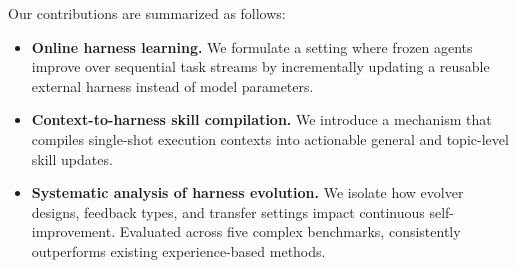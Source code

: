 Our contributions are summarized as follows:
\begin{itemize}[itemsep=0pt,topsep=2pt,leftmargin=*]
    \item \textbf{Online harness learning.}
    We formulate a setting where frozen agents improve over sequential task streams by incrementally updating a reusable external harness instead of model parameters.
    
    \item \textbf{Context-to-harness skill compilation.}
    We introduce a mechanism that compiles single-shot execution contexts into actionable general and topic-level skill updates.
    
    \item \textbf{Systematic analysis of harness evolution.}
    We isolate how evolver designs, feedback types, and transfer settings impact continuous self-improvement. Evaluated across five complex benchmarks, \algname{} consistently outperforms existing experience-based methods.
\end{itemize}
